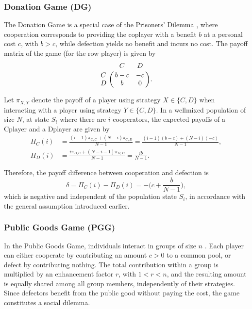\documentclass{article}
\begin{document}
\subsubsection{Donation Game (DG)}

\noindent The Donation Game is a special case of the Prisoners' Dilemma \cite{sigmund2010calculus}, where cooperation corresponds to providing the co\text{-}player with a benefit $b$ at a personal cost $c$, with $b>c$, while defection yields no benefit and incurs no cost. The payoff matrix of the game (for the row player) is given by
\[
 \bordermatrix{~ & C & D\cr
                  C & b-c & -c \cr
                  D & b & 0  \cr
                 }.
\]

\noindent Let $\pi_{X,Y}$ denote the payoff of a player using strategy $X \in \{C,D\}$ when interacting with a player using strategy $Y \in \{C,D\}$. In a well\text{-}mixed population of size $N$, at state $S_i$ where there are $i$ cooperators, the expected payoffs of a C\text{-}player and a D\text{-}player are given by
\begin{equation*}
\begin{aligned}
\Pi_C(i) &= \frac{(i-1)\pi_{C,C} + (N-i)\pi_{C,D}}{N-1}
         = \frac{(i-1)(b-c) + (N-i)(-c)}{N-1}, \\
\Pi_D(i) &= \frac{i\pi_{D,C} + (N-i-1)\pi_{D,D}}{N-1}
         = \frac{ib}{N-1}.
\end{aligned}
\end{equation*}

\noindent Therefore, the payoff difference between cooperation and defection is
\[
\delta = \Pi_C(i) - \Pi_D(i) = -\Big(c + \frac{b}{N-1}\Big),
\]
which is negative and independent of the population state $S_i$, in accordance with the general assumption introduced earlier.

\subsubsection{Public Goods Game (PGG)}
\noindent In the Public Goods Game, individuals interact in groups of size $n$ \cite{hauert2007via}. Each player can either cooperate by contributing an amount $c>0$ to a common pool, or defect by contributing nothing. The total contribution within a group is multiplied by an enhancement factor $r$, with $1<r<n$, and the resulting amount is equally shared among all group members, independently of their strategies. Since defectors benefit from the public good without paying the cost, the game constitutes a social dilemma.
\end{document}
